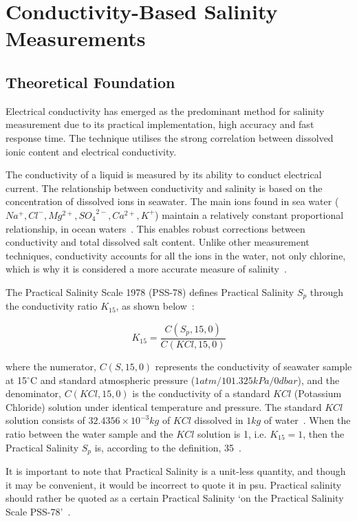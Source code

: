 \section{Conductivity-Based Salinity Measurements}
\subsection{Theoretical Foundation}\label{sec:salinity_theory}
Electrical conductivity has emerged as the predominant method for salinity measurement due to its practical implementation, high accuracy and fast response time.
The technique utilises the strong correlation between dissolved ionic content and electrical conductivity.

The conductivity of a liquid is measured by its ability to conduct electrical current.
The relationship between conductivity and salinity is based on the concentration of dissolved ions in seawater.
The main ions found in sea water ($Na^+, Cl^-, Mg^{2+}, {SO_4}^{2-}, Ca^{2+}, K^+$) maintain a relatively constant proportional relationship, in ocean waters~\cite{chemical_ocean}.
This enables robust corrections between conductivity and total dissolved salt content.
Unlike other measurement techniques, conductivity accounts for all the ions in the water, not only chlorine, which is why it is considered a more accurate measure of salinity~\cite{salinity_def_calc}.

The Practical Salinity Scale 1978 (PSS-78) defines Practical Salinity $S_p$ through the conductivity ratio $K_{15}$, as shown below~\cite{teos-10}:

\begin{equation}\label{eqn:k15_salinity}
    K_{15} = \frac{C(S_p, 15, 0)}{C(KCl, 15, 0)}
\end{equation}

where the numerator, $C(S, 15, 0)$ represents the conductivity of seawater sample at 15$^\circ$C and standard atmospheric pressure ($1 atm/101.325 kPa/0dbar$), and the denominator, $C(KCl, 15, 0)$ is the conductivity of a standard $KCl$ (Potassium Chloride) solution under identical temperature and pressure.
The standard $KCl$ solution consists of $32.4356 \times 10^{-3}kg$ of $KCl$ dissolved in $1kg$ of water~\cite{lewis_pss78}.
When the ratio between the water sample and the $KCl$ solution is 1, i.e. $K_{15} = 1$, then the Practical Salinity $S_p$ is, according to the definition, 35~\cite{teos-10}.

It is important to note that Practical Salinity is a unit-less quantity, and though it may be convenient, it would be incorrect to quote it in \gls{psu}. 
Practical salinity should rather be quoted as a certain Practical Salinity `on the Practical Salinity Scale PSS-78'~\cite{teos-10}. 

